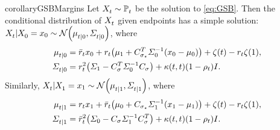\begin{restatable}{corollary}{GSBMargins}
\label{cor:GSB-Margins}
Let $X^{}_{ t } \sim \mathbb{P}^{}_{ t }$ be the solution to \eqref{eq:GSB}. Then the conditional distribution of $X^{}_{ t }$ given endpoints has a simple solution: $\Xsol \vert \Xsol[0] = x_0 \sim \Ncal\parens*{  \cmeansol{\ctime}{0}, \cSigmasol{\ctime}{0} }$, where
\begin{align}
\cmeansol{\ctime}{0} 
&= \ratioc x_0 + \ratio \parens*{   \malt + C_{\sigma_\star}^T  \covar^{-1}(x_0 - \m) } + \tshift - \ratio \tshift[\horizon], %
\label{eq:cmean-marginal-0}
\\
\cSigmasol{\ctime}{0} &= \ratio^2 \parens*{ \covaralt - \Cstar^T  \covar^{-1}\Cstar } + \kernel[\ctime][\ctime]  \parens*{ 1- \efftr } \eye. %
\label{eq:csigma-marginal-0}
\end{align}
Similarly, $\Xsol \vert \Xsol[\horizon] = x_{\horizon} \sim \Ncal\parens*{  \cmeansol{\ctime}{\horizon}, \cSigmasol{\ctime}{\horizon} }$, where
\begin{align}
\cmeansol{\ctime}{\horizon} 
&= \ratio x_{\horizon} + \ratioc \parens*{   \m + C_{\sigma_\star} \covaralt^{-1}(x_{\horizon} - \malt) } + \tshift - \ratio \tshift[\horizon], %
\label{eq:cmean-marginal-T} \\
\cSigmasol{\ctime}{\horizon} &= \ratioc^2 \parens*{ \covar - \Cstar \covaralt^{-1}\Cstar^{T } } + \kernel[\ctime][\ctime]  \parens*{ 1- \efftr } \eye. %
\label{eq:csigma-marginal-T}
\end{align}
\end{restatable}

